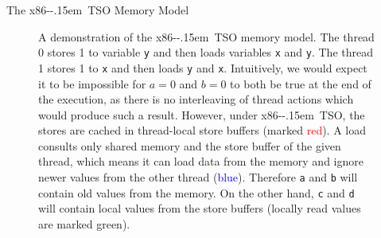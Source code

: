 \documentclass[final, 20pt, a0]{beamer}
\newlength{\twocolwid}
\newcommand{\xtso}{\mbox{x86-\kern-.15em TSO}\xspace}
\begin{document}
\begin{frame}[t]
\begin{columns}[t]
\begin{column}{\twocolwid}
\begin{block}{The \xtso Memory Model}
\begin{figure}[h]
\begin{center}
  \end{center}

  \caption{
  A demonstration of the \xtso memory model.
  The thread 0 stores 1 to variable \texttt{y} and then loads variables \texttt{x} and \texttt{y}.
  The thread 1 stores 1 to \texttt{x} and then loads \texttt{y} and \texttt{x}.
  Intuitively, we would expect it to be impossible for $a = 0$ and $b = 0$ to both be true at the end of the execution, as there is no interleaving of thread actions which would produce such a result.
  However, under \xtso, the stores are cached in thread-local store buffers (marked \textcolor{red}{red}).
  A load consults only shared memory and the store buffer of the given thread, which means it can load data from the memory and ignore newer values from the other thread (\textcolor{blue}{blue}).
  Therefore \texttt{a} and \texttt{b} will contain old values from the memory.
  On the other hand, \texttt{c} and \texttt{d} will contain local values from the store buffers (locally read values are marked \textcolor{dgreen}{green}).
  }
  \vspace{-1ex}
  \end{figure}


\end{block}
\end{column}
\end{columns}
\end{frame}
\end{document}
